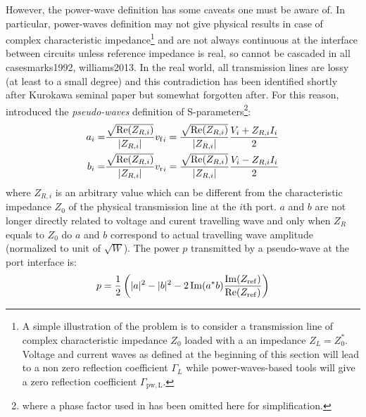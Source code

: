 However, the power-wave definition has some caveats one must be aware of. In particular, power-waves definition may not give physical results in case of complex characteristic impedance\footnote{A simple illustration of the problem is to consider a transmission line of complex characteristic impedance $Z_0$ loaded with a an impedance $Z_L=Z_0^*$. Voltage and current waves as defined at the beginning of this section will lead to a non zero reflection coefficient $\Gamma_L$ while power-waves-based tools will give a zero reflection coefficient $\Gamma_\mathrm{pw,L}$\cite{amakawa2016}.} and are not always continuous at the interface between circuits unless reference impedance is real, so cannot be cascaded in all cases{marks1992, williams2013}. In the real world, all transmission lines are lossy (at least to a small degree) and this contradiction has been identified shortly after Kurokawa seminal paper\cite{amakawa2016} but somewhat forgotten after. For this reason,  introduced the \textit{pseudo-waves} definition of S-parameters\footnote{where a phase factor used in \cite{marks1992} has been omitted here for simplification.}:
\begin{subequations}
	\begin{align}
		a_i =& \frac{\sqrt{\Re(Z_{R,i})}}{|Z_{R,i}|} {v_{\mathrm{f}}}_i 
		= \frac{\sqrt{\Re(Z_{R,i})}}{|Z_{R,i}|} \frac{V_i + Z_{R,i} I_i}{2} \\
		b_i =& \frac{\sqrt{\Re(Z_{R,i})}}{|Z_{R,i}|} {v_{\mathrm{r}}}_i 
= \frac{\sqrt{\Re(Z_{R,i})}}{|Z_{R,i}|} \frac{V_i - Z_{R,i} I_i}{2}		
	\end{align}
\end{subequations}
where $Z_{R,i}$ is an arbitrary value which can be different from the characteristic impedance $Z_0$ of the physical transmission line at the $i$th port. $a$ and $b$ are not longer directly related to voltage and curent travelling wave and only when $Z_{R}$ equals to $Z_0$ do $a$ and $b$ correspond to actual travelling wave amplitude (normalized to unit of $\sqrt{\si{W}}$). The power $p$ transmitted by a pseudo-wave at the port interface is:
\begin{equation}
p = \frac{1}{2} \left(|a|^2 - |b|^2 - 2\Im(a^* b) \frac{\Im({Z_{\mathrm{ref}}})}{\Re({Z_{\mathrm{ref}}})} \right)
\end{equation}

